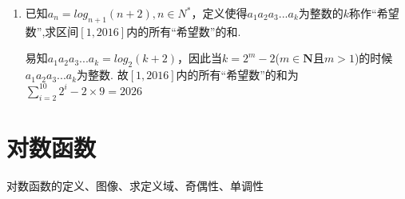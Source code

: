 \begin{enumerate}
\begin{jieda}
        为了消元，需要表示出$x^y$，故前式变形为$y+ln4 = log_xe$，进一步变形为$x^{y+ln4} = e$，因此$x^y = \dfrac{e}{x^{ln4}}$，将其代入原始方程组第一个式子有$\dfrac{e}{4} = \dfrac{e}{x^{ln4}} \cdot lnx$，即$x^{ln4} = 4lnx$，即$4^{lnx} = 4lnx$.\\
        令$t = lnx, t \in \mathbf{R}$，故$4^t = 4t$，解得$t = 1$或$2$. \\
        故$x = e, y = 1 - ln4$或$x = \sqrt{e}, y = 2 - ln4$
    \end{jieda}
    \item 已知$a_n = log_{n+1}(n+2), n \in N^*$，定义使得$a_1a_2a_3...a_k$为整数的$k$称作“希望数”,求区间$[1, 2016]$内的所有“希望数”的和.
    \begin{jieda}
        易知$a_1a_2a_3...a_k = log_2(k+2)$，因此当$k = 2^m - 2$($m \in \mathbf{N}$且$m > 1$)的时候$a_1a_2a_3...a_k$为整数.
        故$[1, 2016]$内的所有“希望数”的和为$\sum_{i = 2}^{10}2^{i} - 2 \times 9 = 2026$
    \end{jieda}
    
\end{enumerate}

\section{对数函数}

\zsd 对数函数的定义、图像、求定义域、奇偶性、单调性

